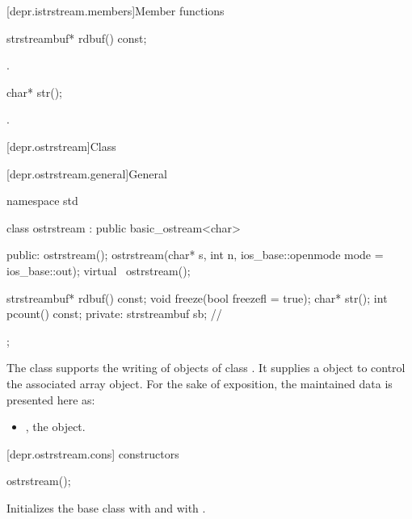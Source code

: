 [depr.istrstream.members]{Member functions}

%
\begin{itemdecl}
strstreambuf* rdbuf() const;
\end{itemdecl}

\begin{itemdescr}
\pnum
\returns
{}.
\end{itemdescr}

%
\begin{itemdecl}
char* str();
\end{itemdecl}

\begin{itemdescr}
\pnum
\returns
{}.
\end{itemdescr}

[depr.ostrstream]{Class }

[depr.ostrstream.general]{General}

%
\begin{codeblock}
namespace std {
  class ostrstream : public basic_ostream<char> {
  public:
    ostrstream();
    ostrstream(char* s, int n, ios_base::openmode mode = ios_base::out);
    virtual ~ostrstream();

    strstreambuf* rdbuf() const;
    void freeze(bool freezefl = true);
    char* str();
    int pcount() const;
  private:
    strstreambuf sb;            // \expos
  };
}
\end{codeblock}

\pnum
The class
supports the writing of objects of class
.
It supplies a
object to control the associated array object.
For the sake of exposition, the maintained data is presented here as:
\begin{itemize}
\item
{}, the  object.
\end{itemize}

[depr.ostrstream.cons]{ constructors}

%
\begin{itemdecl}
ostrstream();
\end{itemdecl}

\begin{itemdescr}
\pnum
\effects
Initializes the base class with  and
 with .
\end{itemdescr}

